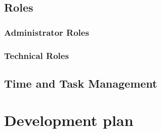 \documentclass[10pt,a4paper]{article}
\begin{document}
\subsection{Roles}
\subsubsection{Administrator Roles} 


\subsubsection{Technical Roles}


\subsection{Time and Task Management}

\section{Development plan}
\end{document}
